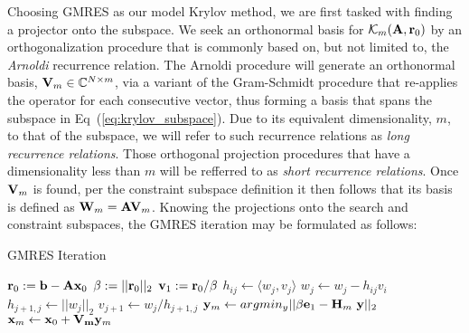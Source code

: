Choosing GMRES as our model Krylov method, we are first tasked with
finding a projector onto the subspace. We seek an orthonormal basis
for $\mathcal{K}_m(\mathbf{A},\mathbf{r}_0)$ by an orthogonalization procedure
that is commonly based on, but not limited to, the \textit{Arnoldi}
recurrence relation. The Arnoldi procedure will generate an
orthonormal basis, $\mathbf{V}_m \in \mathbb{C}^{N \times m}$, via a
variant of the Gram-Schmidt procedure that re-applies the operator for
each consecutive vector, thus forming a basis that spans the subspace
in Eq~(\ref{eq:krylov_subspace}). Due to its equivalent
dimensionality, $m$, to that of the subspace, we will refer to such
recurrence relations as \textit{long recurrence relations}. Those
orthogonal projection procedures that have a dimensionality less than
$m$ will be refferred to as \textit{short recurrence relations}.  Once
$\mathbf{V}_m$ is found, per the constraint subspace definition it then
follows that its basis is defined as $\mathbf{W}_m = \mathbf{A}
\mathbf{V}_m$. Knowing the projections onto the search and constraint
subspaces, the GMRES iteration may be formulated as follows:
\begin{algorithm}[htpb!]
  \caption{GMRES Iteration}
  \label{alg:gmres}
  \begin{algorithmic}
    \State $\mathbf{r}_0 := \mathbf{b}-\mathbf{A}\mathbf{x}_0$
    \State $\beta := ||\mathbf{r}_0||_2$
    \State $\mathbf{v}_1 := \mathbf{r}_0 / \beta$
    \State $h_{ij} \leftarrow \langle w_j,v_j \rangle$
    \State $w_j \leftarrow w_j - h_{ij}v_i$
    \EndFor
    \State $h_{j+1,j} \leftarrow ||w_j||_2$
    \State $v_{j+1} \leftarrow w_j / h_{j+1,j}$
    \State $\mathbf{y}_m \leftarrow argmin_y ||\beta \mathbf{e}_1 - \mathbf{H}_m\
    \mathbf{y}||_2 $
    \State $\mathbf{x}_m \leftarrow \mathbf{x}_0 + \mathbf{V_m} \mathbf{y}_m$
  \end{algorithmic}
\end{algorithm}

